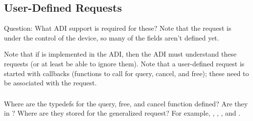 \documentclass{article}
\begin{document}
\subsubsection{}

\subsubsection{}

\subsubsection{}

\subsubsection{}

\subsection{User-Defined Requests}
\label{sec:grequest}

Question:  What ADI support is required for these?  Note that the
request is under the control of the device, so many of the fields
aren't defined yet.

Note that if  is implemented in the ADI, then the
ADI must understand these requests (or at least be able to ignore
them).
Note that a user-defined request is started with callbacks (functions
to call for query, cancel, and free); these need to be associated with
the request.  

\subsubsection{}
Where are the typedefs for the query, free, and cancel function defined? 
Are they in ?  Where are they stored for the generalized request?
For example, ,
,
, and
. 

\subsubsection{}
\end{document}
